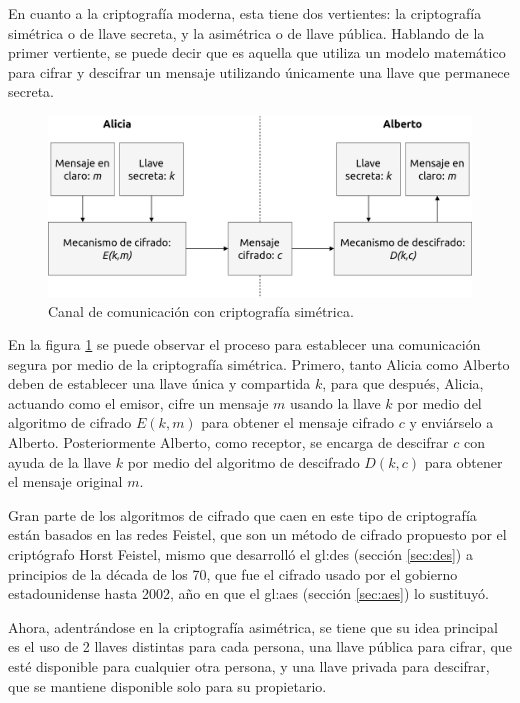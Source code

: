 En cuanto a la criptografía moderna, esta tiene dos vertientes: la
criptografía simétrica o de llave secreta, y la asimétrica o de llave
pública. Hablando de la primer vertiente, se puede decir que es aquella
que utiliza un modelo matemático para cifrar y descifrar un mensaje
utilizando únicamente una llave que permanece secreta.

\begin{figure}
  \begin{center}
    \includegraphics[width=0.8\linewidth]
      {../../../../diagramas_comunes/marco_teorico/cripto_simetrica.png}
    \caption{Canal de comunicación con criptografía simétrica.}
    \label{cripto_simetrica}
  \end{center}
\end{figure}

En la figura \ref{cripto_simetrica} se puede observar el proceso para
establecer una comunicación segura por medio de la criptografía simétrica.
Primero, tanto Alicia como Alberto deben de establecer una llave única y
compartida $k$, para que después, Alicia, actuando como el emisor, cifre un
mensaje $m$ usando la llave $k$ por medio del algoritmo de cifrado $E(k,m)$
para obtener el mensaje cifrado $c$ y enviárselo a Alberto. Posteriormente
Alberto, como receptor, se encarga de descifrar $c$ con ayuda de la llave $k$
por medio del algoritmo de descifrado $D(k,c)$ para obtener el mensaje original
$m$.

Gran parte de los algoritmos de cifrado que caen en este tipo de criptografía
están basados en las redes Feistel, que son un método de cifrado propuesto
por el criptógrafo Horst Feistel, mismo que desarrolló el \gls{gl:des}
(sección \ref{sec:des}) a principios de la década de los 70, que fue el
cifrado usado por el gobierno estadounidense hasta 2002, año en que el
\gls{gl:aes} (sección \ref{sec:aes}) lo sustituyó.

Ahora, adentrándose en la criptografía asimétrica, se tiene que su idea
principal es el uso de 2 llaves distintas para cada persona, una llave
pública para cifrar, que esté disponible para cualquier otra persona, y una
llave privada para descifrar, que se mantiene disponible solo para su
propietario.

